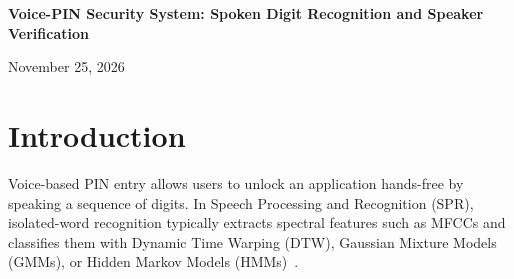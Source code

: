 \documentclass[12pt,a4paper]{article}
\begin{document}
\setcounter{page}{1}
\begin{center}
    {\LARGE \textbf{Voice-PIN Security System: Spoken Digit Recognition and Speaker Verification}\par}
    \vspace{0.5cm}
    {\large November 25, 2026\par}
\end{center}

\begin{abstract}
This project implements a Voice-PIN unlock web application that recognizes spoken digits (\texttt{0}--\texttt{9}) and verifies the speaker's identity. For digit recognition, we compare Dynamic Time Warping (DTW), Gaussian Mixture Models (GMM), and Hidden Markov Models (HMM) using 39-dimensional Mel-Frequency Cepstral Coefficients (MFCCs with first and second derivatives). Audio is recorded in the browser using an \texttt{AudioWorklet} with decibel-based Voice Activity Detection (VAD) and sent to a FastAPI backend for silence trimming and classification. To reject non-digit words and background noise, the system checks both the confidence margin between the top two digits and a per-digit score threshold. We also add two-factor speaker verification using a Gaussian Mixture Model with a Universal Background Model (GMM-UBM) adapted via Maximum A Posteriori (MAP) estimation and Cepstral Mean and Variance Normalization (CMVN). On 55 test recordings from two speakers, \texttt{hmmlearn} HMM and our custom GMM both achieved \textbf{96.36\%} accuracy (53/55), multi-template DTW achieved \textbf{90.91\%} (50/55), and the speaker verifier separated the enrolled owner from an impostor.
\end{abstract}

\section{Introduction}
Voice-based PIN entry allows users to unlock an application hands-free by speaking a sequence of digits. In Speech Processing and Recognition (SPR), isolated-word recognition typically extracts spectral features such as MFCCs and classifies them with Dynamic Time Warping (DTW), Gaussian Mixture Models (GMMs), or Hidden Markov Models (HMMs)~\cite{rabiner1989tutorial}.
\end{document}
